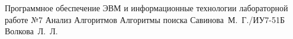 \documentclass{bmstu}
\begin{document}
	
	{Программное обеспечение ЭВМ и информационные технологии}
	{лабораторной работе №7}
	{Анализ Алгоритмов}
	{Алгоритмы поиска}
	{}
	{Савинова~М.~Г./ИУ7-51Б}
	{Волкова~Л.~Л.}
	
	\maketableofcontents
	
	
	
	
	
	
	
	
	\makebibliography
	
\end{document}
